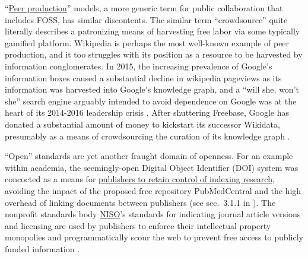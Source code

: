 ``\href{https://en.wikipedia.org/wiki/Peer_production}{Peer
production}'' models, a more generic term for public collaboration that
includes FOSS, has similar discontents. The similar term
``crowdsource'' quite literally
describes a patronizing means of harvesting free labor via some
typically gamified platform. Wikipedia is perhaps the most well-known
example of peer production,
and it too struggles with its position as a resource to be harvested by
information conglomerates. In 2015, the increasing prevalence of
Google's information boxes caused a substantial decline in wikipedia
pageviews \cite{UserTalkJimbo2015, hinkisGoogleSteals5502015}  as
its information was harvested into Google's knowledge graph, and a
``will she, won't she'' search engine arguably intended to avoid
dependence on Google was at the heart of its 2014-2016 leadership crisis
\cite{whiteWikimediaTimelineEvents2016, buetlerSearchDestroyKnowledge2016} . After shuttering Freebase,
Google has donated a substantial amount of money to kickstart its
successor \cite{pellissiertanonFreebaseWikidataGreat2016} 
Wikidata, presumably as a means of crowdsourcing the curation of its
knowledge graph \cite{wikimediameta-wikiGoogleMeta, GoogleStakeWikidata2019, vrandecicWikidataFreeCollaborative2014} .

``Open'' standards are yet another fraught domain of openness. For an
example within academia, the seemingly-open Digital Object Identifier
(DOI) system was concocted as a means for
\href{https://jon-e.net/infrastructure/\#seemingly-prosocial-protocols-can-be-used-by-industries-to-preem}{publishers
to retain control of indexing research}, avoiding the impact of the
proposed free repository PubMedCentral and the high overhead of linking
documents between publishers (see sec.~3.1.1 in \cite{saundersDecentralizedInfrastructureNeuro2022} ). The nonprofit
standards body \href{https://www.niso.org}{NISO}'s standards for
indicating journal article versions \cite{nisoRP82008JournalArticle2008}  and licensing \cite{nisoRP222021AccessLicense2021}  are used by publishers to enforce
their intellectual property monopolies and programmatically scour the
web to prevent free access to publicly funded information \cite{carpenterNewArticleSharing2021} .

